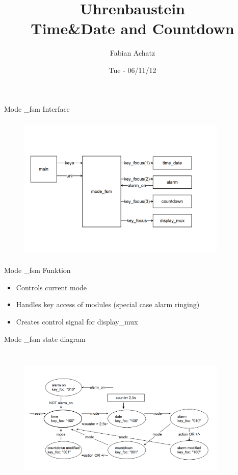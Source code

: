 \documentclass{beamer}
\title[Title of presentation]{Uhrenbaustein\\
{\small Time&Date and Countdown}
}
\author[author name]
{Fabian Achatz}
\institute[Fnord GmbH]{Lehrstuhl f{\"u}r integrierte Systeme}
\date{Tue - 06/11/12}
\begin{document}
%




  \begin{frame}{Mode \_fsm Interface}  
  	\begin{figure}
  		\includegraphics[width=100mm, height=70mm]{pictures/mode_fsm_interface.png}
  	\end{figure}
  \end{frame}
  
    \begin{frame}{Mode \_fsm Funktion}  
    	    \begin{itemize}
    	        \item Controls current mode
    	        \item Handles key access of modules (special case alarm ringing)
    	        \item Creates control signal for display\_mux
    	    \end {itemize}
    \end{frame}

  \begin{frame}{Mode \_fsm state diagram}
  	\begin{figure}
    	\includegraphics[width=100mm, height=70mm]{pictures/mode_fsm_state.png}
    \end{figure}
  \end{frame}
\end{document}
